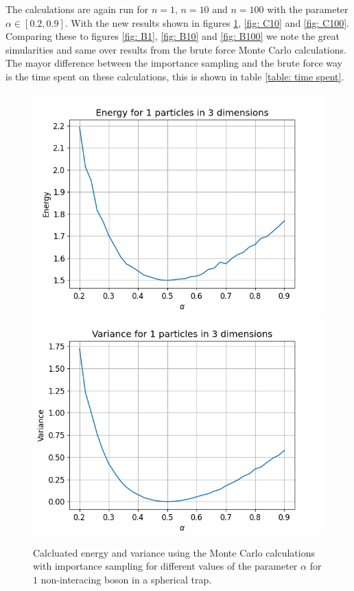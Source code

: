 \documentclass[a4paper, 10pt, english]{revtex4-2} %
\begin{document}
    The calculations are again run for $n = 1$, $n = 10$ and $n=100$ with the parameter $\alpha \in [0.2, 0.9]$.
    With the new results shown in figures \ref{fig: C1}, \ref{fig: C10} and \ref{fig: C100}.
    Comparing these to figures \ref{fig: B1}, \ref{fig: B10} and \ref{fig: B100} we note the great simularities and same over results from the brute force Monte Carlo calculations.
    The mayor difference between the importance sampling and the brute force way is the time spent on these calculations, this is shown in table \ref{table: time spent}.
    \begin{figure}[!ht]
        \centering
        \includegraphics[width=\imwidth]{figures/Energy_C_1.png}
        \includegraphics[width=\imwidth]{figures/Varience_C_1.png}
        \caption{Calcluated energy and variance using the Monte Carlo calculations with importance sampling for different values of the parameter $\alpha$ for $1$ non-interacing boson in a spherical trap.}
        \label{fig: C1}
    \end{figure}
\end{document}
